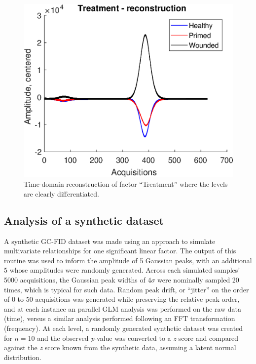 \documentclass[preprint,12pt]{elsarticle}
\begin{document}
\begin{figure}[hbt!]
    \centering
    \includegraphics[width=0.9\linewidth]{figures/time_treat.eps}
    \caption{Time-domain reconstruction of factor ``Treatment'' where the levels are clearly differentiated.}
    \label{fig:freq_treat}
\end{figure}

\subsection{Analysis of a synthetic dataset}

A synthetic GC-FID dataset was made using an approach to simulate multivariate relationships \cite{Camacho2016} for one significant linear factor. The output of this routine was used to inform the amplitude of 5 Gaussian peaks, with an additional 5 whose amplitudes were randomly generated. Across each simulated samples' 5000 acquisitions, the Gaussian peak widths of $4\sigma$ were nominally sampled 20 times, which is typical for such data. Random peak drift, or ``jitter'' on the order of 0 to 50 acquisitions was generated while preserving the relative peak order, and at each instance an parallel GLM analysis was performed on the raw data (time), versus a similar analysis performed following an FFT transformation (frequency). At each level, a randomly generated synthetic dataset was created for $n=10$ and the observed \textit{p}-value was converted to a \textit{z} score and compared against the \textit{z} score known from the synthetic data, assuming a latent normal distribution.
\end{document}
